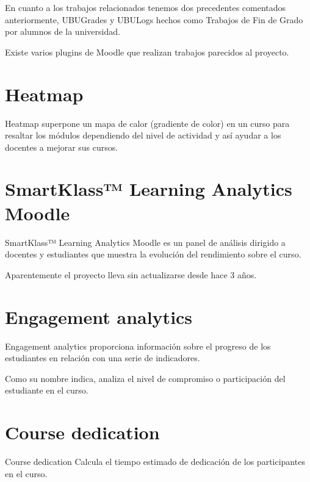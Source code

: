 
En cuanto a los trabajos relacionados tenemos dos precedentes comentados anteriormente, UBUGrades y UBULogs hechos como Trabajos de Fin de Grado por alumnos de la universidad.

Existe varios plugins de Moodle que realizan trabajos parecidos al proyecto.

\section{Heatmap}

Heatmap\cite{noauthor_moodle_nodate-2} superpone un mapa de calor (gradiente de color) en un curso para resaltar los módulos dependiendo del nivel de actividad y así ayudar a los docentes a mejorar sus cursos.


\section{SmartKlass™ Learning Analytics Moodle}
SmartKlass™ Learning Analytics Moodle\cite{noauthor_moodle_nodate-3} es un panel de análisis dirigido a docentes y estudiantes que muestra la evolución del rendimiento sobre el curso.

Aparentemente el proyecto lleva sin actualizarse desde hace 3 años\cite{noauthor_klassdata/moodle-local_smart_klass:_nodate}.


\section{Engagement analytics}

Engagement analytics\cite{noauthor_moodle_nodate-4} proporciona información sobre el progreso de los estudiantes en relación con una serie de indicadores.

Como su nombre indica, analiza el nivel de compromiso o participación del estudiante en el curso.

\section{Course dedication}

Course dedication\cite{noauthor_moodle_nodate-5} Calcula el tiempo estimado de dedicación de los participantes en el curso.




